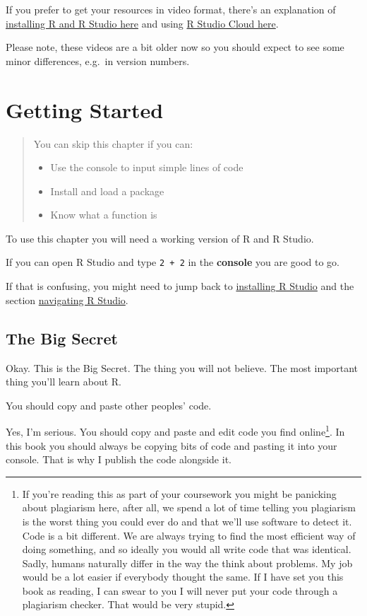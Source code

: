\documentclass[
]{book}
\begin{document}
If you prefer to get your resources in video format, there's an explanation of \href{https://media.ed.ac.uk/media/R+ConversationsA+Installing+R+and+R+Studio/1_q0mdj8mk/104843251}{installing R and R Studio here} and using \href{https://media.ed.ac.uk/media/R+ConversationsA+R+Studio+Online/1_ex8u0oj7/112983051}{R Studio Cloud here}.

Please note, these videos are a bit older now so you should expect to see some minor differences, e.g.~in version numbers.

\hypertarget{start}{%
\chapter{Getting Started}\label{start}}

\begin{quote}
You can skip this chapter if you can:

\begin{itemize}
\item
  Use the console to input simple lines of code
\item
  Install and load a package
\item
  Know what a function is
\end{itemize}
\end{quote}

To use this chapter you will need a working version of R and R Studio.

If you can open R Studio and type \texttt{2\ +\ 2} in the \textbf{console} you are good to go.

If that is confusing, you might need to jump back to \protect\hyperlink{install_rs}{installing R Studio} and the section \protect\hyperlink{navigate_rs}{navigating R Studio}.

\hypertarget{thesecret}{%
\section{The Big Secret}\label{thesecret}}

Okay. This is the Big Secret. The thing you will not believe. The most important thing you'll learn about R.

You should copy and paste other peoples' code.

Yes, I'm serious. You should copy and paste and edit code you find online\footnote{If you're reading this as part of your coursework you might be panicking about plagiarism here, after all, we spend a lot of time telling you plagiarism is the worst thing you could ever do and that we'll use software to detect it. Code is a bit different. We are always trying to find the most efficient way of doing something, and so ideally you would all write code that was identical. Sadly, humans naturally differ in the way the think about problems. My job would be a lot easier if everybody thought the same. If I have set you this book as reading, I can swear to you I will never put your code through a plagiarism checker. That would be very stupid.}. In this book you should always be copying bits of code and pasting it into your console. That is why I publish the code alongside it.
\end{document}
